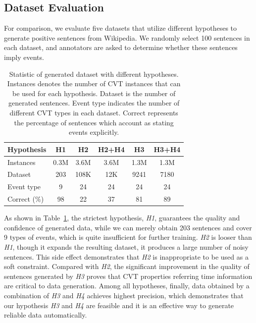 \documentclass{article}
\begin{document}
\subsection{Dataset Evaluation}\label{sec:evalhypo}
For comparison, we evaluate five datasets that utilize different hypotheses to generate positive sentences from Wikipedia. We randomly select 100 sentences in each dataset, and annotators are asked to determine whether these sentences imply events. 

\begin{table}[h]
\small
\centering
\begin{tabular}{|l|c|c|c|c|c|} \hline
	Hypothesis & H1 & H2 & H2+H4 & H3 & H3+H4 \\ \hline
	Instances & 0.3M & 3.6M & 3.6M & 1.3M & 1.3M \\ \hline
	Dataset & 203 & 108K & 12K & 9241 & 7180 \\ \hline
	Event type & 9 & 24 & 24 & 24 & 24 \\ \hline
	Correct (\%) & 98 & 22 & 37 & 81 & 89 \\ \hline
\end{tabular}
\caption{Statistic of generated dataset with different hypotheses. Instances denotes the number of CVT instances that can be used for each hypothesis. Dataset is the number of generated sentences. Event type indicates the number of different CVT types in each dataset. Correct represents the percentage of sentences which account as stating events explicitly. \label{tab:3}}
\end{table}

As shown in Table~\ref{tab:3}, the strictest hypothesis, \emph{H1}, guarantees the quality and confidence of generated data, while we can merely obtain 203 sentences and cover 9 types of events,  which is quite insufficient for further training. \emph{H2} is looser than \emph{H1}, though it expands the resulting dataset, it produces a large number of noisy sentences. This side effect  demonstrates that \emph{H2} is inappropriate to be used as a soft constraint. Compared with \emph{H2}, the significant improvement in the quality of sentences generated by \emph{H3} proves that CVT properties referring time information are critical to data generation. Among all hypotheses, finally, data obtained by a combination of \emph{H3} and \emph{H4} achieves highest precision, which demonstrates that our hypothesis \emph{H3} and \emph{H4} are feasible and it is an effective way to generate reliable data automatically.
\end{document}
